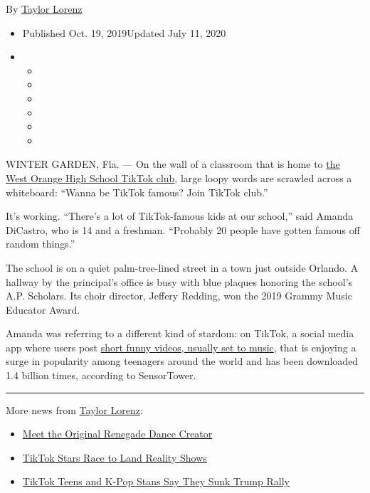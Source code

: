 By \href{https://www.nytimes3xbfgragh.onion/by/taylor-lorenz}{Taylor
Lorenz}

\begin{itemize}
\item
  Published Oct. 19, 2019Updated July 11, 2020
\item
  \begin{itemize}
  \item
  \item
  \item
  \item
  \item
  \item
  \end{itemize}
\end{itemize}

WINTER GARDEN, Fla. --- On the wall of a classroom that is home to
\href{http://vm.tiktok.com/5qoKE6/}{the West Orange High School TikTok
club}, large loopy words are scrawled across a whiteboard: ``Wanna be
TikTok famous? Join TikTok club.''

It's working. ``There's a lot of TikTok-famous kids at our school,''
said Amanda DiCastro, who is 14 and a freshman. ``Probably 20 people
have gotten famous off random things.''

The school is on a quiet palm-tree-lined street in a town just outside
Orlando. A hallway by the principal's office is busy with blue plaques
honoring the school's A.P. Scholars. Its choir director, Jeffery
Redding, won the 2019 Grammy Music Educator Award.

Amanda was referring to a different kind of stardom: on TikTok, a social
media app where users post
\href{https://www.nytimes3xbfgragh.onion/2019/03/10/style/what-is-tik-tok.html}{short
funny videos, usually set to music}, that is enjoying a surge in
popularity among teenagers around the world and has been downloaded 1.4
billion times, according to SensorTower.

\begin{center}\rule{0.5\linewidth}{\linethickness}\end{center}

More news from
\href{https://www.nytimes3xbfgragh.onion/by/taylor-lorenz}{Taylor
Lorenz}:

\begin{itemize}
\item
  \href{https://www.nytimes3xbfgragh.onion/2020/02/13/style/the-original-renegade.html}{Meet
  the Original Renegade Dance Creator}
\item
  \href{https://www.nytimes3xbfgragh.onion/2020/07/09/style/tiktok-stars-race-to-land-reality-shows.html}{TikTok
  Stars Race to Land Reality Shows}
\item
  \href{https://www.nytimes3xbfgragh.onion/2020/06/21/style/tiktok-trump-rally-tulsa.html}{TikTok
  Teens and K-Pop Stans Say They Sunk Trump Rally}
\end{itemize}

